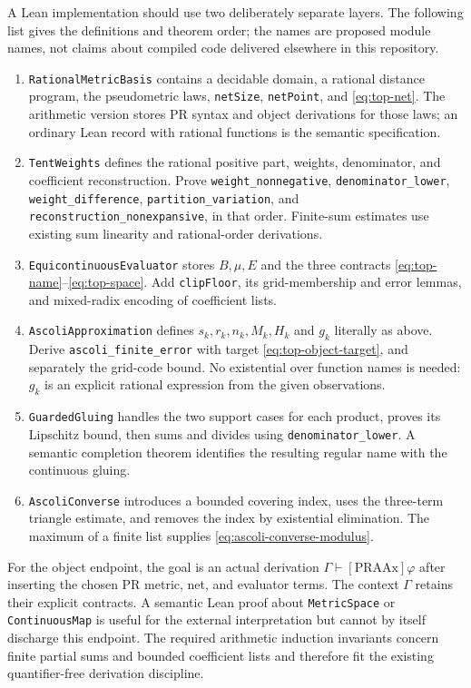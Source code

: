 A Lean implementation should use two deliberately separate layers.
The following list gives the definitions and theorem order; the names
are proposed module names, not claims about compiled code delivered
elsewhere in this repository.
\begin{enumerate}
 \item \texttt{RationalMetricBasis} contains a decidable domain, a
 rational distance program, the pseudometric laws, \texttt{netSize},
 \texttt{netPoint}, and \eqref{eq:top-net}.  The arithmetic version
 stores PR syntax and object derivations for those laws; an ordinary
 Lean record with rational functions is the semantic specification.
 \item \texttt{TentWeights} defines the rational positive part,
 weights, denominator, and coefficient reconstruction.  Prove
 \texttt{weight\_nonnegative}, \texttt{denominator\_lower},
 \texttt{weight\_difference}, \texttt{partition\_variation}, and
 \texttt{reconstruction\_nonexpansive}, in that order.  Finite-sum
 estimates use existing sum linearity and rational-order derivations.
 \item \texttt{EquicontinuousEvaluator} stores $B,\mu,E$ and the
 three contracts \eqref{eq:top-name}--\eqref{eq:top-space}.  Add
 \texttt{clipFloor}, its grid-membership and error lemmas, and
 mixed-radix encoding of coefficient lists.
 \item \texttt{AscoliApproximation} defines $s_k,r_k,n_k,M_k,H_k$
 and $g_k$ literally as above.  Derive
 \texttt{ascoli\_finite\_error} with target
 \eqref{eq:top-object-target}, and separately the grid-code bound.
 No existential over function names is needed: $g_k$ is an explicit
 rational expression from the given observations.
 \item \texttt{GuardedGluing} handles the two support cases for each
 product, proves its Lipschitz bound, then sums and divides using
 \texttt{denominator\_lower}.  A semantic completion theorem
 identifies the resulting regular name with the continuous gluing.
 \item \texttt{AscoliConverse} introduces a bounded covering index,
 uses the three-term triangle estimate, and removes the index by
 existential elimination.  The maximum of a finite list supplies
 \eqref{eq:ascoli-converse-modulus}.
\end{enumerate}

For the object endpoint, the goal is an actual derivation
$\Gamma\vdash[\mathrm{PRAAx}]\varphi$ after inserting the chosen
PR metric, net, and evaluator terms.  The context $\Gamma$ retains
their explicit contracts.  A semantic Lean proof about
\texttt{MetricSpace} or \texttt{ContinuousMap} is useful for the
external interpretation but cannot by itself discharge this endpoint.
The required arithmetic induction invariants concern finite partial
sums and bounded coefficient lists and therefore fit the existing
quantifier-free derivation discipline.
